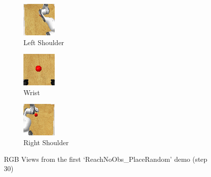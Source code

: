 \begin{figure}[htpb] %
  \centering
  \begin{subfigure}{0.3\linewidth}
    \centering
    \includegraphics[width=0.5\linewidth]{assets/cam-comb/reach-no-obs/demo1-step30-left_shoulder.png}
    \caption{Left Shoulder}\label{subfig:rno-random-ls}
  \end{subfigure}
  \begin{subfigure}{0.3\linewidth}
    \centering
    \includegraphics[width=0.5\linewidth]{assets/cam-comb/reach-no-obs/demo1-step30-wrist.png}
    \caption{Wrist}\label{subfig:rno-random-wrist}
  \end{subfigure}
  \begin{subfigure}{0.3\linewidth}
    \centering
    \includegraphics[width=0.5\linewidth]{assets/cam-comb/reach-no-obs/demo1-step30-right_shoulder.png}
    \caption{Right Shoulder}\label{subfig:rno-random-rs}
  \end{subfigure}
  \caption{RGB Views from the first `ReachNoObs\_PlaceRandom' demo (step 30)}\label{fig:rno-random-rgb-views}
\end{figure}

